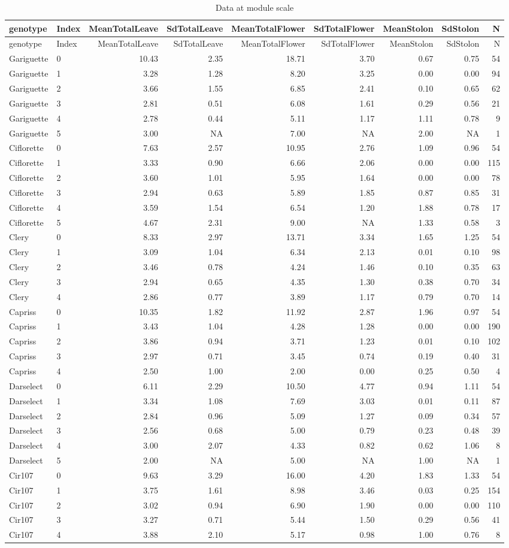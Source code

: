 \documentclass[]{article}
\begin{document}
\begin{longtable}[]{@{}llrrrrrrr@{}}
\caption{Data at module scale}\tabularnewline
\toprule
genotype & Index & MeanTotalLeave & SdTotalLeave & MeanTotalFlower &
SdTotalFlower & MeanStolon & SdStolon & N\tabularnewline
\midrule
\endfirsthead
\toprule
genotype & Index & MeanTotalLeave & SdTotalLeave & MeanTotalFlower &
SdTotalFlower & MeanStolon & SdStolon & N\tabularnewline
\midrule
\endhead
Gariguette & 0 & 10.43 & 2.35 & 18.71 & 3.70 & 0.67 & 0.75 &
54\tabularnewline
Gariguette & 1 & 3.28 & 1.28 & 8.20 & 3.25 & 0.00 & 0.00 &
94\tabularnewline
Gariguette & 2 & 3.66 & 1.55 & 6.85 & 2.41 & 0.10 & 0.65 &
62\tabularnewline
Gariguette & 3 & 2.81 & 0.51 & 6.08 & 1.61 & 0.29 & 0.56 &
21\tabularnewline
Gariguette & 4 & 2.78 & 0.44 & 5.11 & 1.17 & 1.11 & 0.78 &
9\tabularnewline
Gariguette & 5 & 3.00 & NA & 7.00 & NA & 2.00 & NA & 1\tabularnewline
Ciflorette & 0 & 7.63 & 2.57 & 10.95 & 2.76 & 1.09 & 0.96 &
54\tabularnewline
Ciflorette & 1 & 3.33 & 0.90 & 6.66 & 2.06 & 0.00 & 0.00 &
115\tabularnewline
Ciflorette & 2 & 3.60 & 1.01 & 5.95 & 1.64 & 0.00 & 0.00 &
78\tabularnewline
Ciflorette & 3 & 2.94 & 0.63 & 5.89 & 1.85 & 0.87 & 0.85 &
31\tabularnewline
Ciflorette & 4 & 3.59 & 1.54 & 6.54 & 1.20 & 1.88 & 0.78 &
17\tabularnewline
Ciflorette & 5 & 4.67 & 2.31 & 9.00 & NA & 1.33 & 0.58 &
3\tabularnewline
Clery & 0 & 8.33 & 2.97 & 13.71 & 3.34 & 1.65 & 1.25 & 54\tabularnewline
Clery & 1 & 3.09 & 1.04 & 6.34 & 2.13 & 0.01 & 0.10 & 98\tabularnewline
Clery & 2 & 3.46 & 0.78 & 4.24 & 1.46 & 0.10 & 0.35 & 63\tabularnewline
Clery & 3 & 2.94 & 0.65 & 4.35 & 1.30 & 0.38 & 0.70 & 34\tabularnewline
Clery & 4 & 2.86 & 0.77 & 3.89 & 1.17 & 0.79 & 0.70 & 14\tabularnewline
Capriss & 0 & 10.35 & 1.82 & 11.92 & 2.87 & 1.96 & 0.97 &
54\tabularnewline
Capriss & 1 & 3.43 & 1.04 & 4.28 & 1.28 & 0.00 & 0.00 &
190\tabularnewline
Capriss & 2 & 3.86 & 0.94 & 3.71 & 1.23 & 0.01 & 0.10 &
102\tabularnewline
Capriss & 3 & 2.97 & 0.71 & 3.45 & 0.74 & 0.19 & 0.40 &
31\tabularnewline
Capriss & 4 & 2.50 & 1.00 & 2.00 & 0.00 & 0.25 & 0.50 & 4\tabularnewline
Darselect & 0 & 6.11 & 2.29 & 10.50 & 4.77 & 0.94 & 1.11 &
54\tabularnewline
Darselect & 1 & 3.34 & 1.08 & 7.69 & 3.03 & 0.01 & 0.11 &
87\tabularnewline
Darselect & 2 & 2.84 & 0.96 & 5.09 & 1.27 & 0.09 & 0.34 &
57\tabularnewline
Darselect & 3 & 2.56 & 0.68 & 5.00 & 0.79 & 0.23 & 0.48 &
39\tabularnewline
Darselect & 4 & 3.00 & 2.07 & 4.33 & 0.82 & 0.62 & 1.06 &
8\tabularnewline
Darselect & 5 & 2.00 & NA & 5.00 & NA & 1.00 & NA & 1\tabularnewline
Cir107 & 0 & 9.63 & 3.29 & 16.00 & 4.20 & 1.83 & 1.33 &
54\tabularnewline
Cir107 & 1 & 3.75 & 1.61 & 8.98 & 3.46 & 0.03 & 0.25 &
154\tabularnewline
Cir107 & 2 & 3.02 & 0.94 & 6.90 & 1.90 & 0.00 & 0.00 &
110\tabularnewline
Cir107 & 3 & 3.27 & 0.71 & 5.44 & 1.50 & 0.29 & 0.56 & 41\tabularnewline
Cir107 & 4 & 3.88 & 2.10 & 5.17 & 0.98 & 1.00 & 0.76 & 8\tabularnewline
\bottomrule
\end{longtable}
\end{document}
